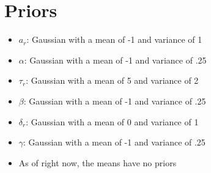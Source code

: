 \documentclass[letterpaper,12pt,preprint]{aastex}
\begin{document}
\section{Priors}
\begin{itemize}
\item $a_r$: Gaussian with a mean of -1 and variance of 1
\item $\alpha$: Gaussian with a mean of -1 and variance of .25
\item $\tau_r$: Gaussian with a mean of 5 and variance of 2
\item $\beta$: Gaussian with a mean of -1 and variance of .25
\item $\delta_r$: Gaussian with a mean of 0 and variance of 1
\item $\gamma$: Gaussian with a mean of -1 and variance of .25
\item As of right now, the means have no priors
\end{itemize}
\end{document}
